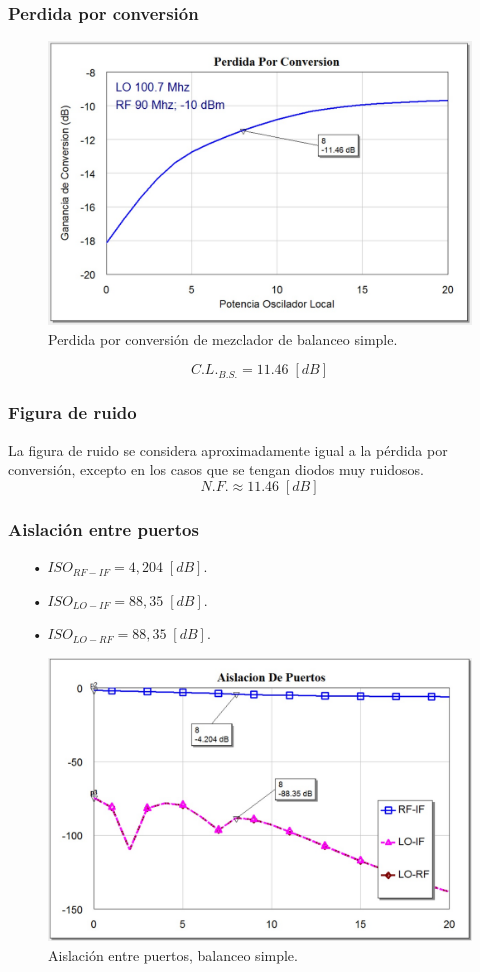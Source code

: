 \documentclass[twocolumn]{article}
\begin{document}
\subsubsection{Perdida por conversión}
%
\begin{figure}[h]
  \centering    
	\includegraphics[width=\columnwidth]{imagenes/CL2.jpg}
	\caption{Perdida por conversión de mezclador de balanceo simple.}\label{fig:CL2}
\end{figure}
\[C.L._{B.S.} = 11.46 \; [dB] \]
%
\subsubsection{Figura de ruido}
%
La figura de ruido se considera aproximadamente igual a la pérdida por conversión, excepto en los casos que se tengan diodos muy ruidosos.
\[N.F. \approx 11.46 \; [dB] \]
%
\subsubsection{Aislación entre puertos}
%
\begin{itemize}\itemsep0em
\item[•]  $ISO_{RF-IF} = 4,204 \; [dB]$.
\item[•]  $ISO_{LO-IF} = 88,35 \; [dB]$.
\item[•]  $ISO_{LO-RF} = 88,35 \; [dB]$.
\end{itemize}
%
\begin{figure}[h!]
  \centering    
	\includegraphics[scale=0.3]{imagenes/ISO2.jpg}
	\caption{Aislación entre puertos, balanceo simple.}\label{fig:ISO2}
\end{figure}
\clearpage
%
\end{document}
